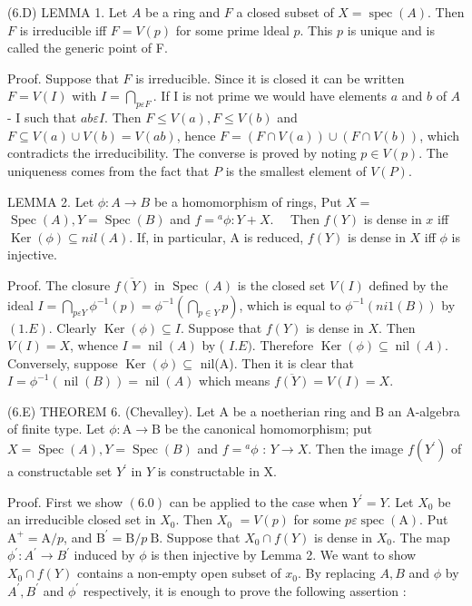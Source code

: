(6.D) LEMMA 1. Let $A$ be a ring and $F$ a closed subset of $X=\operatorname{spec}(A)$. Then $F$ is irreducible iff $F=V(p)$ for some prime ldeal $p$. This $p$ is unique and is called the generic point of F.

Proof. Suppose that $F$ is irreducible. Since it is closed it can be written $F=V(I)$ with $I=\bigcap_{p \varepsilon F}$. If I is not prime we would have elements $a$ and $b$ of $A$ - I such that $a b \varepsilon I$. Then $F \leqslant V(a), F \leqslant V(b)$ and $F \subseteq V(a) \cup V(b)=V(a b)$, hence $F=(F \cap V(a)) \cup(F \cap V(b))$, which contradicts the irreducibility. The converse is proved by noting $p \in V(p)$. The uniqueness comes from the fact that $P$ is the smallest element of $V(P)$.

LEMMA 2. Let $\phi: A \rightarrow B$ be a homomorphism of rings, Put $X=$ $\operatorname{Spec}(A), Y=\operatorname{Spec}(B)$ and $f={ }^{a} \phi: Y+X . \quad$ Then $f(Y)$ is dense in $x$ iff $\operatorname{Ker}(\phi) \subseteq n i l(A)$. If, in particular, A is reduced, $f(Y)$ is dense in $X$ iff $\phi$ is injective.

Proof. The closure $\overline{f(Y)}$ in $\operatorname{Spec}(A)$ is the closed set $V(I)$ defined by the ideal $I=\bigcap_{p \varepsilon Y} \phi^{-1}(p)=\phi^{-1}\left(\bigcap_{p \in Y} p\right)$, which is equal to $\phi^{-1}(n i 1(B))$ by $(1 . E) .$ Clearly $\operatorname{Ker}(\phi) \subseteq I$. Suppose that $f(Y)$ is dense in $X$. Then $V(I)=X$, whence $I=\operatorname{nil}(A)$ by ( $I . E)$. Therefore $\operatorname{Ker}(\phi) \subseteq \operatorname{nil}(A)$. Conversely, suppose $\operatorname{Ker}(\phi) \subseteq$ nil(A). Then it is clear that $I=\phi^{-1}(\operatorname{nil}(B))=\operatorname{nil}(A)$ which means $\overline{f(Y)}=V(I)=X$.

(6.E) THEOREM 6. (Chevalley). Let A be a noetherian ring and $\mathrm{B}$ an A-algebra of finite type. Let $\phi: \mathrm{A} \rightarrow \mathrm{B}$ be the canonical homomorphism; put $X=\operatorname{Spec}(A), Y=\operatorname{Spec}(B)$ and $f={ }^{a} \phi$ : $Y \rightarrow X$. Then the image $f\left(Y^{\prime}\right)$ of a constructable set $Y^{\prime}$ in $Y$ is constructable in $\mathrm{X}$.

Proof. First we show $(6.0)$ can be applied to the case when $Y^{\prime}=Y$. Let $X_{0}$ be an irreducible closed set in $X_{0}$. Then $X_{0}$ $=V(p)$ for some $p \varepsilon \operatorname{spec}(\mathrm{A})$. Put $\mathrm{A}^{+}=\mathrm{A} / p$, and $\mathrm{B}^{\prime}=\mathrm{B} / p \mathrm{~B}$. Suppose that $X_{0} \cap f(Y)$ is dense in $X_{0}$. The map $\phi^{\prime}: A^{\prime} \rightarrow B^{\prime}$ induced by $\phi$ is then injective by Lemma 2. We want to show $X_{0} \cap f(Y)$ contains a non-empty open subset of $x_{0}$. By replacing $A, B$ and $\phi$ by $A^{\prime}, B^{\prime}$ and $\phi^{\prime}$ respectively, it is enough to prove the following assertion :

